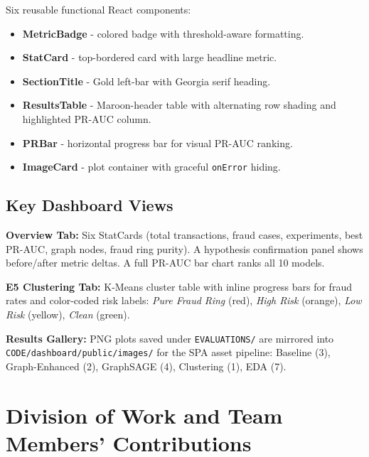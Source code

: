 \documentclass[conference]{IEEEtran}
\begin{document}
Six reusable functional React components:
\begin{itemize}
    \item \textbf{MetricBadge} - colored badge with threshold-aware formatting.
    \item \textbf{StatCard} - top-bordered card with large headline metric.
    \item \textbf{SectionTitle} - Gold left-bar with Georgia serif heading.
    \item \textbf{ResultsTable} - Maroon-header table with alternating row shading and highlighted PR-AUC column.
    \item \textbf{PRBar} - horizontal progress bar for visual PR-AUC ranking.
    \item \textbf{ImageCard} - plot container with graceful \texttt{onError} hiding.
\end{itemize}

\subsection{Key Dashboard Views}

\textbf{Overview Tab:} Six StatCards (total transactions, fraud cases, experiments, best PR-AUC, graph nodes, fraud ring purity). A hypothesis confirmation panel shows before/after metric deltas. A full PR-AUC bar chart ranks all 10 models.

\textbf{E5 Clustering Tab:} K-Means cluster table with inline progress bars for fraud rates and color-coded risk labels: \textit{Pure Fraud Ring} (red), \textit{High Risk} (orange), \textit{Low Risk} (yellow), \textit{Clean} (green).

\textbf{Results Gallery:} PNG plots saved under \texttt{EVALUATIONS/} are mirrored into \texttt{CODE/dashboard/public/images/} for the SPA asset pipeline: Baseline (3), Graph-Enhanced (2), GraphSAGE (4), Clustering (1), EDA (7).

\section{Division of Work and Team Members' Contributions}
\end{document}

